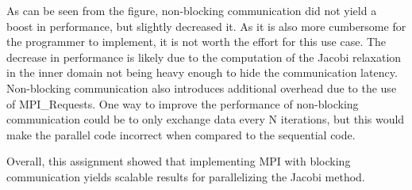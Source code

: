 As can be seen from the figure, non-blocking communication did not yield a boost in performance, but slightly decreased it. As it is also more cumbersome for the programmer to implement, it is not worth the effort for this use case. The decrease in performance is likely due to the computation of the Jacobi relaxation in the inner domain not being heavy enough to hide the communication latency. Non-blocking communication also introduces additional overhead due to the use of MPI\_Requests. One way to improve the performance of non-blocking communication could be to only exchange data every N iterations, but this would make the parallel code incorrect when compared to the sequential code. 

Overall, this assignment showed that implementing MPI with blocking communication yields scalable results for parallelizing the Jacobi method.